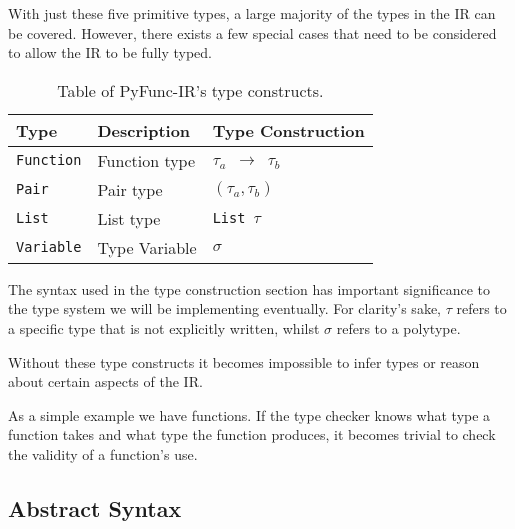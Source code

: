 \documentclass{l4proj}
\begin{document}
With just these five primitive types, a large majority of the types in the IR can be covered.
However, there exists a few special cases that need to be considered to allow the IR to be fully typed.

\begin{table}[h]
\caption{Table of PyFunc-IR's type constructs.}
\label{tab:pyfunc-ir-type-constructs}
\begin{center}
\begin{tabular}{@{}|l|l|l|@{}}
    \hline
    \textbf{Type}        & \textbf{Description}      & \textbf{Type Construction}  \\
    \hline
    \texttt{Function}    & Function type             & \texttt{$\tau_a$ $\rightarrow$ $\tau_b$} \\
    \texttt{Pair}        & Pair type                 & \texttt{$(\tau_a, \tau_b)$} \\
    \texttt{List}        & List type                 & \texttt{List $\tau$} \\
    \texttt{Variable}    & Type Variable             & \texttt{$\sigma$} \\
    \hline
\end{tabular}
\end{center}
\end{table}

The syntax used in the type construction section has important significance to the type system we will be implementing eventually.
For clarity's sake, $\tau$ refers to a specific type that is not explicitly written, whilst $\sigma$ refers to a polytype. 

Without these type constructs it becomes impossible to infer types or reason about certain aspects of the IR.

As a simple example we have functions.
If the type checker knows what type a function takes and what type the function produces, it becomes trivial to check the validity of a function's use.


\subsection{Abstract Syntax}
\end{document}
